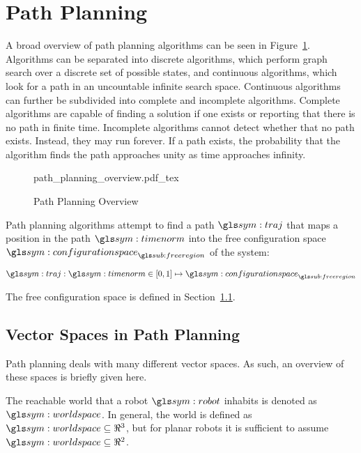 \section{Path Planning}%
\label{sec:path_planning}

	A broad overview of path planning algorithms can be seen in
	Figure~\ref{fig:path_planning_overview}. Algorithms can be separated into
	discrete algorithms, which perform graph search over a discrete set of
	possible states, and continuous algorithms, which look for a path in an
	uncountable infinite search space. Continuous algorithms can further be
	subdivided into complete and incomplete algorithms. Complete algorithms are
	capable of finding a solution if one exists or reporting that there is no
	path in finite time. Incomplete algorithms cannot detect whether that no
	path exists. Instead, they may run forever. If a path exists, the
	probability that the algorithm finds the path approaches unity as time
	approaches infinity.

	\begin{figure}[hb]
		\centering
		\def\svgwidth{\columnwidth}
		{path_planning_overview.pdf_tex}
		\caption{Path Planning Overview}%
		\label{fig:path_planning_overview}
	\end{figure}

	Path planning algorithms attempt to find a path $\pathsym$ that maps a
	position in the path $\timenorm$ into the free configuration space
	$\configurationspace_{\freeregion}$ of the system:

	\begin{equation}
		\pathsym : \timenorm \in [0, 1] \mapsto \configurationspace_{\freeregion}
	\end{equation}

	The free configuration space is defined in
	Section~\ref{sec:vector_spaces_in_path_planning}.


	\subsection{Vector Spaces in Path Planning}%
	\label{sec:vector_spaces_in_path_planning}

		Path planning deals with many different vector spaces. As such, an
		overview of these spaces is briefly given here.

		The reachable world that a robot $\robot$ inhabits is denoted as
		$\world$. In general, the world is defined as $\world \subseteq \Re^3$,
		but for planar robots it is sufficient to assume $\world \subseteq
		\Re^2$.

